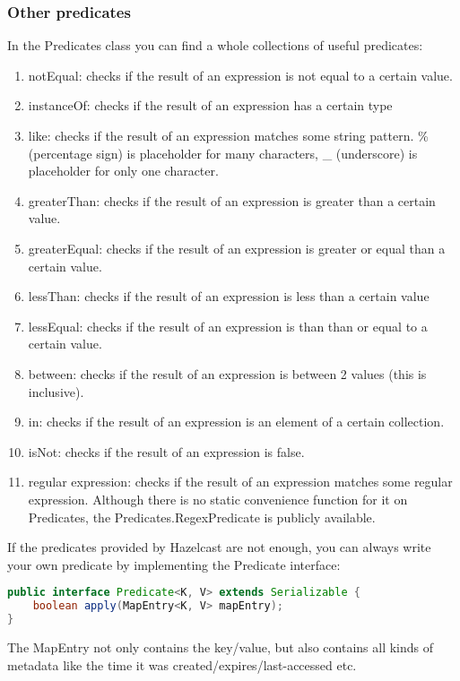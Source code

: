 \subsubsection*{Other predicates}
In the Predicates class you can find a whole collections of useful predicates:
\begin{enumerate}
\item notEqual: checks if the result of an expression is not equal to a certain value.
\item instanceOf: checks if the result of an expression has a certain type
\item like: checks if the result of an expression matches some string pattern. \% (percentage sign) is placeholder for many characters, \_ (underscore) is placeholder for only one character.
\item greaterThan: checks if the result of an expression is greater than a certain value.
\item greaterEqual: checks if the result of an expression is greater or equal than a certain value.
\item lessThan: checks if the result of an expression is less than a certain value
\item lessEqual: checks if the result of an expression is than than or equal to a certain value.
\item between: checks if the result of an expression is between 2 values (this is inclusive).
\item in: checks if the result of an expression is an element of a certain collection.
\item isNot: checks if the result of an expression is false.
\item regular expression: checks if the result of an expression matches some regular expression. Although there is no static convenience function for it on Predicates, the Predicates.RegexPredicate is publicly available.
\end{enumerate}
If the predicates provided by Hazelcast are not enough, you can always write your own predicate by implementing the Predicate interface:
\begin{lstlisting}[language=java]
public interface Predicate<K, V> extends Serializable {
    boolean apply(MapEntry<K, V> mapEntry);
}
\end{lstlisting}
The MapEntry not only contains the key/value, but also contains all kinds of metadata like the time it was created/expires/last-accessed etc. 

